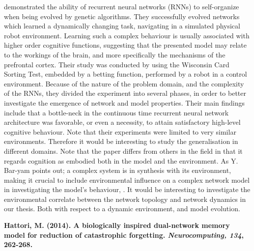 \cite{Maniadakis2012} demonstrated the ability of recurrent neural networks (RNNs) to self-organize when being evolved by genetic algorithms. They successfully evolved networks which learned a dynamically changing task, navigating in a simulated physical robot environment. Learning such a complex behaviour is usually associated with higher order cognitive functions, suggesting that the presented model may relate to the workings of the brain, and more specifically the mechanisms of the prefrontal cortex.
Their study was conducted by using the Wisconsin Card Sorting Test, embedded by a betting function, performed by a robot in a control environment. Because of the nature of the problem domain, and the complexity of the RNNs, they divided the experiment into several phases, in order to better investigate the emergence of network and model properties. Their main findings include that a bottle-neck in the continuous time recurrent neural network architecture was favorable, or even a necessity, to attain satisfactory high-level cognitive behaviour. Note that their experiments were limited to very similar environments. Therefore it would be interesting to study the generalisation in different domains. Note that the paper differs from others in the field in that it regards cognition as embodied both in the model and the environment. As Y. Bar-yam points out; a complex system is in synthesis with its environment, making it crucial to include environmental influence on a complex network model in investigating the model's behaviour, \cite{Bar-yam1997}. It would be interesting to investigate the environmental correlate between the network topology and network dynamics in our thesis. Both with respect to a dynamic environment, and model evolution.


\textbf{Hattori, M. (2014). A biologically inspired dual-network memory model for reduction of catastrophic forgetting. \textit{Neurocomputing, 134}, 262-268.}

